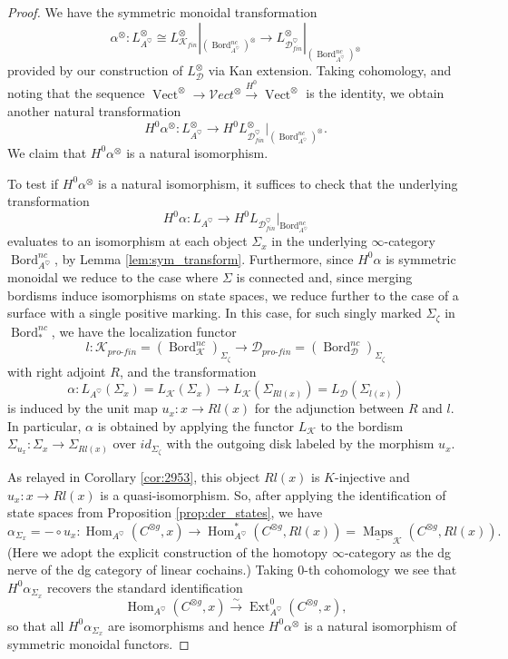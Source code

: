 \documentclass[reqno]{amsart}
\theoremstyle{definition}
\newcommand{\msc}[1]{\mathscr{#1}}
\newcommand{\opn}[1]{\operatorname{#1}}
\newcommand{\ot}{\otimes}
\newcommand{\Vect}{\msc{V}\!ect}
\newcommand{\pf}{pro\text{-}fin}
\DeclareMathOperator{\Hom}{Hom}
\DeclareMathOperator{\Ext}{Ext}
\DeclareMathOperator{\Maps}{Maps}
\DeclareMathOperator{\Bord}{Bord}
\renewcommand{\1}{\mathbf{1}}
\begin{document}
\begin{proof}
We have the symmetric monoidal transformation
\[
\alpha^{\ot}:L_{A^{\heartsuit}}^{\ot}\cong L_{\msc{K}_{fin}}^{\ot}|_{(\Bord_{A^{\heartsuit}}^{nc})^{\ot}}\to L_{\msc{D}_{fin}^{\heartsuit}}^{\ot}|_{(\Bord_{A^{\heartsuit}}^{nc})^{\ot}}
\]
provided by our construction of $L_{\msc{D}}^{\ot}$ via Kan extension.  Taking cohomology, and noting that the sequence $\opn{Vect}^{\ot}\to \Vect^{\ot}\overset{H^0}\to \opn{Vect}^{\ot}$ is the identity, we obtain another natural transformation
\[
H^0\alpha^{\ot}:L_{A^{\heartsuit}}^{\ot}\to H^0L_{\msc{D}_{fin}^{\heartsuit}}^{\ot}|_{(\Bord_{A^{\heartsuit}}^{nc})^{\ot}}.
\]
We claim that $H^0\alpha^{\ot}$ is a natural isomorphism.
\par

To test if $H^0\alpha^{\ot}$ is a natural isomorphism, it suffices to check that the underlying transformation
\[
H^0\alpha:L_{A^{\heartsuit}}\to H^0L_{\msc{D}_{fin}^{\heartsuit}}|_{\Bord_{A^{\heartsuit}}^{nc}}
\]
evaluates to an isomorphism at each object $\Sigma_x$ in the underlying $\infty$-category $\Bord_{A^{\heartsuit}}^{nc}$, by Lemma \ref{lem:sym_transform}.  Furthermore, since $H^0\alpha$ is symmetric monoidal we reduce to the case where $\Sigma$ is connected and, since merging bordisms induce isomorphisms on state spaces, we reduce further to the case of a surface with a single positive marking.  In this case, for such singly marked $\Sigma_{\zeta}$ in $\Bord_{\ast}^{nc}$, we have the localization functor
\[
l:\msc{K}_{\pf}=(\Bord^{nc}_{\msc{K}})_{\Sigma_{\zeta}}\to \msc{D}_{\pf}=(\Bord^{nc}_{\msc{D}})_{\Sigma_{\zeta}}
\]
with right adjoint $R$, and the transformation
\[
\alpha:L_{A^{\heartsuit}}(\Sigma_x)=L_{\msc{K}}(\Sigma_x)\to L_{\msc{K}}(\Sigma_{Rl(x)})=L_{\msc{D}}(\Sigma_{l(x)})
\]
is induced by the unit map $u_x:x\to Rl(x)$ for the adjunction between $R$ and $l$.  In particular, $\alpha$ is obtained by applying the functor $L_{\msc{K}}$ to the bordism $\Sigma_{u_x}:\Sigma_x\to \Sigma_{Rl(x)}$ over $id_{\Sigma_{\zeta}}$ with the outgoing disk labeled by the morphism $u_x$.
\par

As relayed in Corollary \ref{cor:2953}, this object $Rl(x)$ is $K$-injective and $u_x:x\to Rl(x)$ is a quasi-isomorphism.  So, after applying the identification of state spaces from Proposition \ref{prop:der_states}, we have
\[
\alpha_{\Sigma_x}=-\circ u_x:\Hom_{A^{\heartsuit}}(C^{\ot g},x)\to \Hom^{\ast}_{A^{\heartsuit}}(C^{\ot g},Rl(x))=\underline{\Maps}_{\msc{K}}(C^{\ot g},Rl(x)).
\]
(Here we adopt the explicit construction of the homotopy $\infty$-category as the dg nerve of the dg category of linear cochains.) Taking $0$-th cohomology we see that $H^0\alpha_{\Sigma_x}$ recovers the standard identification
\[
\Hom_{A^{\heartsuit}}(C^{\ot g},x)\overset{\sim}\to \Ext^0_{A^{\heartsuit}}(C^{\ot g},x),
\]
so that all $H^0\alpha_{\Sigma_x}$ are isomorphisms and hence $H^0\alpha^{\ot}$ is a natural isomorphism of symmetric monoidal functors.
\end{proof}
\end{document}
